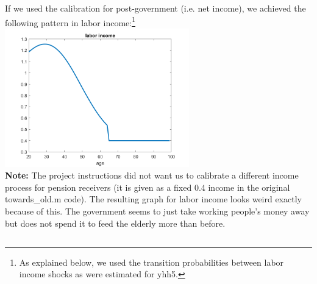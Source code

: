 \documentclass[12pt,a4paper]{article}
\begin{document}
If we used the calibration for post-government (i.e. net income), we achieved the following pattern in labor income:\footnote{As explained below, we used the transition probabilities between labor income shocks as were estimated for yhh5.}\\

\includegraphics[width=0.6\textwidth]{Graphs/labor income post gov.png}\\

\textbf{Note:} The project instructions did not want us to calibrate a different income process for pension receivers (it is given as a fixed 0.4 income in the original towards\_old.m code). The resulting graph for labor income looks weird exactly because of this. The government seems to just take working people's money away but does not spend it to feed the elderly more than before.
\\

\pagebreak

\subsection{}
\end{document}
